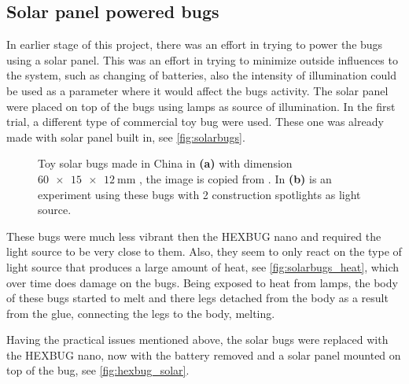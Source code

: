 \subsection{Solar panel powered bugs}

In earlier stage of this project, there was an effort 
in trying to power the bugs using a solar panel. 
This was an effort in trying to minimize outside influences to the system, 
such as changing of batteries, also the intensity of illumination 
could be used as a parameter where it would affect the bugs activity.
The solar panel were placed on top of the bugs using 
lamps as source of illumination. In the first trial, 
a different type of commercial toy bug were used. 
These one was already made with solar panel built in, 
see \cref{fig:solarbugs}.


\begin{figure}[htpb!]
    \centering
    
    \caption{Toy solar bugs made in China in \textbf{(a)} with dimension $\SI[product-units = single]{60 x 15 x 12}{\milli\metre}$ 
    , the image is copied from \cite{www.alibaba.com}. In \textbf{(b)} is an experiment using these bugs with 2 construction 
    spotlights as light source.}
    \label{fig:solarbugs_experiment}
\end{figure}

These bugs were much less vibrant then the HEXBUG nano and required the light source to be very close 
to them. Also, they seem to only react on the type of light source that produces a large amount of heat, see \cref{fig:solarbugs_heat}, 
which over time does damage on the bugs. Being exposed to heat from lamps, the body of these bugs started to melt and there legs 
detached from the body as a result from the glue, connecting the legs to the body, melting. 

Having the practical issues mentioned above, the solar bugs were replaced with the HEXBUG nano, now with the battery removed and 
a solar panel mounted on top of the bug, see \cref{fig:hexbug_solar}.

